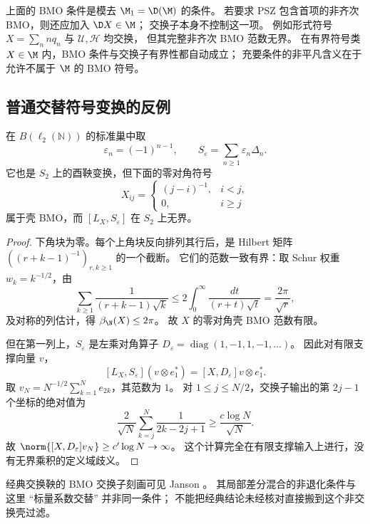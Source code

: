 \begin{remark}[不能遗漏初值]
上面的 BMO 条件是模去 $\M_1=\D(\M)$ 的条件。
若要求 PSZ 包含首项的非齐次 BMO，则还应加入 $\D X\in\M$；
交换子本身不控制这一项。
例如形式符号 $X=\sum_n n q_n$ 与 $\mathcal U,\mathcal H$ 均交换，
但其完整非齐次 BMO 范数无界。
在有界符号类 $X\in\M$ 内，BMO 条件与交换子有界性都自动成立；
充要条件的非平凡含义在于允许不属于 $\M$ 的 BMO 符号。
\end{remark}

\subsection{普通交替符号变换的反例}

\begin{example}\label{ex:scalar-signs}
在 $B(\ell_2(\mathbb N))$ 的标准巢中取
\[
 \varepsilon_n=(-1)^{n-1},\qquad
 S_\varepsilon=\sum_{n\geq1}\varepsilon_n\Delta_n.
\]
它也是 $S_2$ 上的酉鞅变换，但下面的零对角符号
\[
 X_{ij}=\begin{cases}(j-i)^{-1},&i<j,\\0,&i\geq j\end{cases}
\]
属于壳 BMO，而 $[L_X,S_\varepsilon]$ 在 $S_2$ 上无界。
\end{example}

\begin{proof}
下角块为零。每个上角块反向排列其行后，是 Hilbert 矩阵
$((r+k-1)^{-1})_{r,k\geq1}$ 的一个截断。
它们的范数一致有界：取 Schur 权重 $w_k=k^{-1/2}$，由
\[
 \sum_{k\geq1}\frac{1}{(r+k-1)\sqrt k}
 \leq2\int_0^\infty\frac{dt}{(r+t)\sqrt t}
 =\frac{2\pi}{\sqrt r},
\]
及对称的列估计，得 $\beta_\N(X)\leq2\pi$。
故 $X$ 的零对角壳 BMO 范数有限。

但在第一列上，$S_\varepsilon$ 是左乘对角算子
$D_\varepsilon=\operatorname{diag}(1,-1,1,-1,\ldots)$。
因此对有限支撑向量 $v$，
\[
 [L_X,S_\varepsilon](v\otimes e_1^*)
 =[X,D_\varepsilon]v\otimes e_1^*.
\]
取 $v_N=N^{-1/2}\sum_{k=1}^N e_{2k}$，其范数为 $1$。
对 $1\leq j\leq N/2$，交换子输出的第 $2j-1$ 个坐标的绝对值为
\[
 \frac{2}{\sqrt N}\sum_{k=j}^N\frac{1}{2k-2j+1}
 \geq\frac{c\log N}{\sqrt N}.
\]
故 $\norm{[X,D_\varepsilon]v_N}\geq c'\log N\to\infty$。
这个计算完全在有限支撑输入上进行，没有无界乘积的定义域歧义。
\end{proof}

经典交换鞅的 BMO 交换子刻画可见 Janson \cite{Janson}。
其局部差分混合的非退化条件与这里 ``标量系数交替'' 并非同一条件；
不能把经典结论未经核对直接搬到这个非交换壳过滤。

